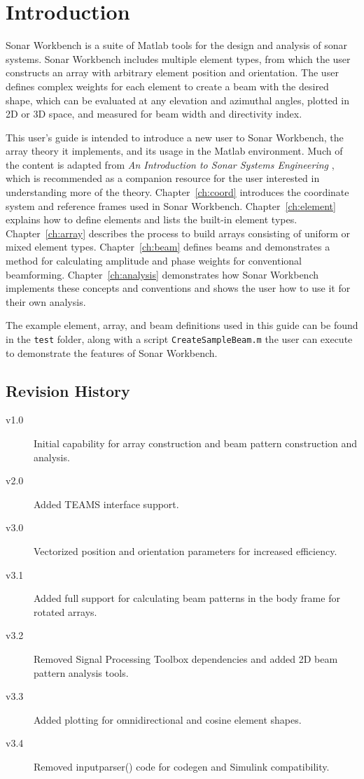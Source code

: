 \chapter{Introduction}\label{ch:intro}

Sonar Workbench is a suite of Matlab tools for the design and analysis of sonar systems. Sonar Workbench includes multiple element types, from which the user constructs an array with arbitrary element position and orientation. The user defines complex weights for each element to create a beam with the desired shape, which can be evaluated at any elevation and azimuthal angles, plotted in 2D or 3D space, and measured for beam width and directivity index.

This user's guide is intended to introduce a new user to Sonar Workbench, the array theory it implements, and its usage in the Matlab environment. Much of the content is adapted from \emph{An Introduction to Sonar Systems Engineering} \cite{Ziomek}, which is recommended as a companion resource for the user interested in understanding more of the theory. Chapter~\ref{ch:coord} introduces the coordinate system and reference frames used in Sonar Workbench. Chapter~\ref{ch:element} explains how to define elements and lists the built-in element types. Chapter~\ref{ch:array} describes the process to build arrays consisting of uniform or mixed element types. Chapter~\ref{ch:beam} defines beams and demonstrates a method for calculating amplitude and phase weights for conventional beamforming. Chapter~\ref{ch:analysis} demonstrates how Sonar Workbench implements these concepts and conventions and shows the user how to use it for their own analysis.

The example element, array, and beam definitions used in this guide can be found in the \texttt{test} folder, along with a script \texttt{CreateSampleBeam.m} the user can execute to demonstrate the features of Sonar Workbench. 

\section*{Revision History}

\begin{description}
\item[v1.0] Initial capability for array construction and beam pattern construction and analysis. 
\item[v2.0] Added TEAMS interface support. 
\item[v3.0] Vectorized position and orientation parameters for increased efficiency. 
\item[v3.1] Added full support for calculating beam patterns in the body frame for rotated arrays. 
\item[v3.2] Removed Signal Processing Toolbox dependencies and added 2D beam pattern analysis tools. 
\item[v3.3] Added plotting for omnidirectional and cosine element shapes.
\item[v3.4] Removed inputparser() code for codegen and Simulink compatibility.
\end{description}